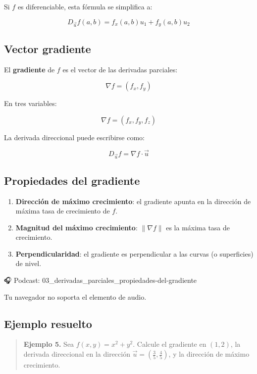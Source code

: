 \documentclass[
]{book}
\providecommand{\tightlist}{%
  \setlength{\itemsep}{0pt}\setlength{\parskip}{0pt}}
\begin{document}
Si \(f\) es diferenciable, esta fórmula se simplifica a:

\[
D_{\vec{u}} f(a, b) = f_x(a, b) u_1 + f_y(a, b) u_2
\]

\subsection{Vector gradiente}\label{vector-gradiente}

El \textbf{gradiente} de \(f\) es el vector de las derivadas parciales:

\[
\nabla f = (f_x, f_y)
\]

En tres variables:

\[
\nabla f = (f_x, f_y, f_z)
\]

La derivada direccional puede escribirse como:

\[
D_{\vec{u}} f = \nabla f \cdot \vec{u}
\]

\subsection{Propiedades del gradiente}\label{propiedades-del-gradiente}

\begin{enumerate}
\def\labelenumi{\arabic{enumi}.}
\tightlist
\item
  \textbf{Dirección de máximo crecimiento}: el gradiente apunta en la dirección de máxima tasa de crecimiento de \(f\).
\item
  \textbf{Magnitud del máximo crecimiento}: \(\|\nabla f\|\) es la máxima tasa de crecimiento.
\item
  \textbf{Perpendicularidad}: el gradiente es perpendicular a las curvas (o superficies) de nivel.
\end{enumerate}

🎧 Podcast: 03\_derivadas\_parciales\_propiedades-del-gradiente

Tu navegador no soporta el elemento de audio.

\subsection{Ejemplo resuelto}\label{ejemplo-resuelto-12}

\begin{quote}
\textbf{Ejemplo 5.} Sea \(f(x, y) = x^2 + y^2\). Calcule el gradiente en \((1, 2)\), la derivada direccional en la dirección \(\vec{u} = (\frac{3}{5}, \frac{4}{5})\), y la dirección de máximo crecimiento.
\end{quote}
\end{document}
